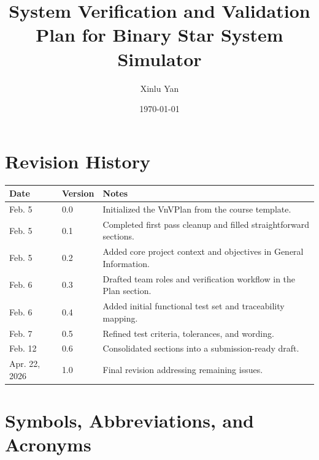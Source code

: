 \documentclass[12pt, titlepage]{article}
\begin{document}
\title{System Verification and Validation Plan for Binary Star System Simulator} 
\author{Xinlu Yan}
\date{\today}
	
\maketitle


\section*{Revision History}

\begin{tabularx}{\textwidth}{p{3cm}p{2cm}X}
\toprule {\bf Date} & {\bf Version} & {\bf Notes}\\
\midrule
Feb. 5 & 0.0 & Initialized the VnVPlan from the course template.\\
Feb. 5 & 0.1 & Completed first pass cleanup and filled straightforward sections.\\
Feb. 5 & 0.2 & Added core project context and objectives in General Information.\\
Feb. 6 & 0.3 & Drafted team roles and verification workflow in the Plan section.\\
Feb. 6 & 0.4 & Added initial functional test set and traceability mapping.\\
Feb. 7 & 0.5 & Refined test criteria, tolerances, and wording.\\
Feb. 12 & 0.6 & Consolidated sections into a submission-ready draft.\\
Apr. 22, 2026 & 1.0 & Final revision addressing remaining issues.\\
\bottomrule
\end{tabularx}

\newpage

\tableofcontents

\newpage

\listoftables

\newpage

\section{Symbols, Abbreviations, and Acronyms}
\end{document}
